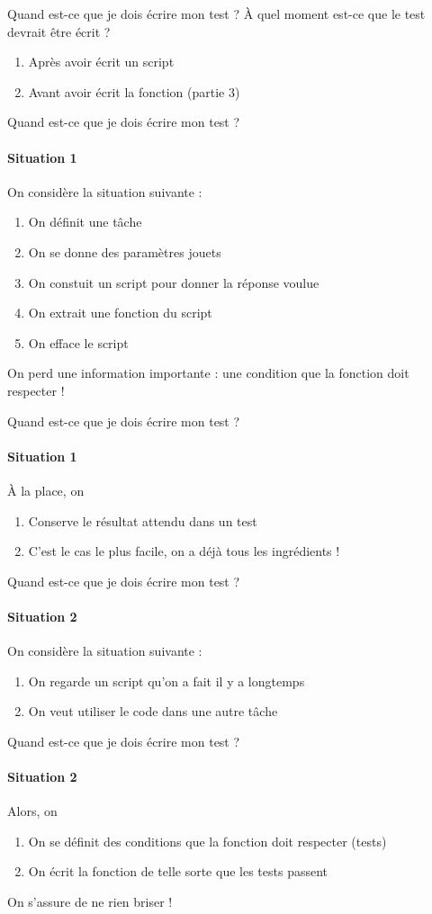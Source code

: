 \documentclass[11pt]{beamer}
\begin{document}
\begin{frame}{Quand est-ce que je dois écrire mon test ?}
À quel moment est-ce que le test devrait être écrit ?
\begin{enumerate}
\item Après avoir écrit un script
\item Avant avoir écrit la fonction (partie 3)
\end{enumerate}
\end{frame}

\begin{frame}{Quand est-ce que je dois écrire mon test ?}
\framesubtitle{Situation 1}
On considère la situation suivante : 
\begin{enumerate}
\item On définit une tâche
\item On se donne des paramètres jouets
\item On constuit un script pour donner la réponse voulue
\item On extrait une fonction du script
\item On efface le script
\end{enumerate}
On perd une information importante : une condition que la fonction doit respecter !
\end{frame}

\begin{frame}{Quand est-ce que je dois écrire mon test ?}
\framesubtitle{Situation 1}
À la place, on
\begin{enumerate}
\item Conserve le résultat attendu dans un test
\item C'est le cas le plus facile, on a déjà tous les ingrédients !
\end{enumerate}
\end{frame}

\begin{frame}{Quand est-ce que je dois écrire mon test ?}
\framesubtitle{Situation 2}
On considère la situation suivante : 
\begin{enumerate}
\item On regarde un script qu'on a fait il y a longtemps
\item On veut utiliser le code dans une autre tâche
\end{enumerate}
\end{frame}

\begin{frame}{Quand est-ce que je dois écrire mon test ?}
\framesubtitle{Situation 2}
Alors, on 
\begin{enumerate}
\item On se définit des conditions que la fonction doit respecter (tests)
\item On écrit la fonction de telle sorte que les tests passent
\end{enumerate}
On s'assure de ne rien briser !
\end{frame}
\end{document}
